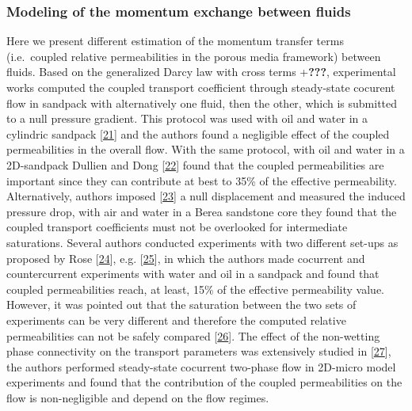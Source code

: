 \documentclass[]{article}
\begin{document}
\hypertarget{modeling-of-the-momentum-exchange-between-fluids}{%
\subsubsection{Modeling of the momentum exchange between
fluids}\label{modeling-of-the-momentum-exchange-between-fluids}}

Here we present different estimation of the momentum transfer terms
(i.e.~coupled relative permeabilities in the porous media framework)
between fluids. Based on the generalized Darcy law with cross terms
+\textbf{???}, experimental works computed the coupled transport
coefficient through steady-state cocurent flow in sandpack with
alternatively one fluid, then the other, which is submitted to a null
pressure gradient. This protocol was used with oil and water in a
cylindric sandpack
{[}\protect\hyperlink{ref-zarcone1994determination}{21}{]} and the
authors found a negligible effect of the coupled permeabilities in the
overall flow. With the same protocol, with oil and water in a
2D-sandpack Dullien and Dong
{[}\protect\hyperlink{ref-Dullien1996}{22}{]} found that the coupled
permeabilities are important since they can contribute at best to 35\%
of the effective permeability. Alternatively, authors imposed
{[}\protect\hyperlink{ref-ramakrishnan2015measurement}{23}{]} a null
displacement and measured the induced pressure drop, with air and water
in a Berea sandstone core they found that the coupled transport
coefficients must not be overlooked for intermediate saturations.
Several authors conducted experiments with two different set-ups as
proposed by Rose {[}\protect\hyperlink{ref-Rose1988}{24}{]}, e.g.
{[}\protect\hyperlink{ref-bentsen1993use}{25}{]}, in which the authors
made cocurrent and countercurrent experiments with water and oil in a
sandpack and found that coupled permeabilities reach, at least, 15\% of
the effective permeability value. However, it was pointed out that the
saturation between the two sets of experiments can be very different and
therefore the computed relative permeabilities can not be safely
compared {[}\protect\hyperlink{ref-langaas2001numerical}{26}{]}. The
effect of the non-wetting phase connectivity on the transport parameters
was extensively studied in {[}\protect\hyperlink{ref-Avraam1995}{27}{]},
the authors performed steady-state cocurrent two-phase flow in 2D-micro
model experiments and found that the contribution of the coupled
permeabilities on the flow is non-negligible and depend on the flow
regimes.
\end{document}
